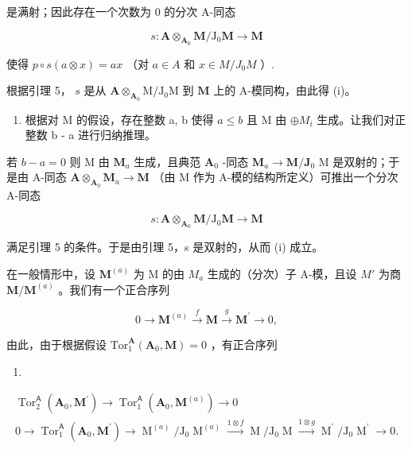 是满射；因此存在一个次数为 0 的分次 A-同态

\[
s: \mathbf {A} \otimes_ {\mathbf {A} _ {0}} \mathbf {M} / \mathrm{J} _ {0} \mathbf {M} \rightarrow \mathbf {M}
\]

使得 \(p \circ s(a \otimes x) = ax\) （对 \(a \in A\) 和 \(x \in M / J_0 M\) ）.

根据引理 5， \(s\) 是从 \(\mathbf{A} \otimes_{\mathbf{A}_0} \mathrm{M} / \mathrm{J}_0 \mathrm{M}\) 到 \(\mathbf{M}\) 上的 A-模同构，由此得 (i)。

\begin{enumerate}
\def\labelenumi{\alph{enumi})}
\setcounter{enumi}{1}
\tightlist
\item
  根据对 M 的假设，存在整数 a, b 使得 \(a \leqslant b\) 且 M 由 \(\oplus M_{i}\) 生成。让我们对正整数 b - a 进行归纳推理。
\end{enumerate}

若 \(b - a = 0\) 则 M 由 \(\mathbf{M}_a\) 生成，且典范 \(\mathbf{A}_0\) -同态 \(\mathbf{M}_a \to \mathbf{M} / \mathbf{J}_0\) M 是双射的；于是由 A-同态 \(\mathbf{A} \otimes_{\mathbf{A}_0} \mathbf{M}_a \to \mathbf{M}\) （由 M 作为 A-模的结构所定义）可推出一个分次 A-同态

\[
s: \mathbf {A} \otimes_ {\mathbf {A} _ {0}} \mathbf {M} / \mathrm{J} _ {0} \mathbf {M} \rightarrow \mathbf {M}
\]

满足引理 5 的条件。于是由引理 5，s 是双射的，从而 (i) 成立。

在一般情形中，设 \(\mathbf{M}^{(a)}\) 为 M 的由 \(M_{a}\) 生成的（分次）子 A-模，且设 \(M'\) 为商 \(\mathbf{M}/\mathbf{M}^{(a)}\) 。我们有一个正合序列

\[
0 \to \mathbf {M} ^ {(a)} \xrightarrow {f} \mathbf {M} \xrightarrow {g} \mathbf {M} ^ {\prime} \to 0,
\]

由此，由于根据假设 \(\mathrm{Tor}_{1}^{\mathbf{A}}(\mathbf{A}_{0},\mathbf{M}) = 0\) ，有正合序列

\begin{enumerate}
\def\labelenumi{(\arabic{enumi})}
\setcounter{enumi}{5}
\tightlist
\item
\end{enumerate}

\[
\begin{array}{c} \operatorname{Tor} _ {2} ^ {\mathsf {A}} (\mathbf {A} _ {0}, \mathbf {M} ^ {\prime}) \to \operatorname{Tor} _ {1} ^ {\mathsf {A}} (\mathbf {A} _ {0}, \mathbf {M} ^ {(a)}) \to 0 \\ 0 \to \operatorname{Tor} _ {1} ^ {\mathsf {A}} (\mathbf {A} _ {0}, \mathbf {M} ^ {\prime}) \to \operatorname{M} ^ {(a)} / \mathrm{J} _ {0} \operatorname{M} ^ {(a)} \xrightarrow {1 \otimes f} \operatorname{M} / \mathrm{J} _ {0} \operatorname{M} \xrightarrow {1 \otimes g} \operatorname{M} ^ {\prime} / \mathrm{J} _ {0} \operatorname{M} ^ {\prime} \to 0. \end{array}\tag{7}
\]

